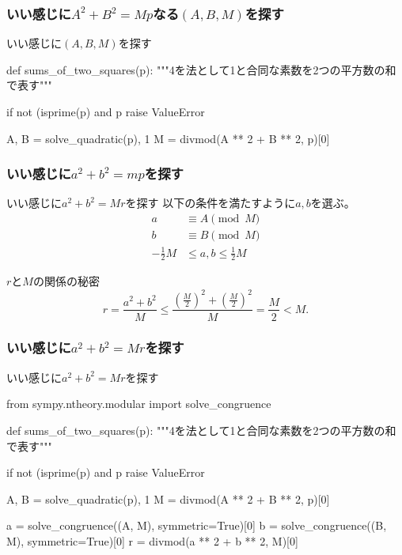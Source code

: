 \documentclass[dvipdfmx,11pt,notheorems]{beamer}
\theoremstyle{definition}
\begin{document}
\begin{frame}[fragile]\frametitle{いい感じに$A^{2}+B^{2} = Mp$なる$(A, B, M)$を探す}

\begin{block}{いい感じに$(A, B, M)$を探す}
\begin{pyverbatim}
def sums_of_two_squares(p):
    """4を法として1と合同な素数を2つの平方数の和で表す"""

    if not (isprime(p) and p %
        raise ValueError
            
    A, B = solve_quadratic(p), 1
    M = divmod(A ** 2 + B ** 2, p)[0]
\end{pyverbatim}
\end{block}

\end{frame}

\begin{frame}[fragile]\frametitle{いい感じに$a^{2}+b^{2}=mp$を探す}

\begin{block}{いい感じに$a^{2}+b^{2}=Mr$を探す}
以下の条件を満たすように$a, b$を選ぶ。
\begin{align*} 
a &\equiv A \pmod{M} \\ 
b &\equiv B \pmod{M} \\ 
-\frac{1}{2}M &\leq a, b \leq \frac{1}{2}M
\end{align*}
\end{block}

\begin{exampleblock}{$r$と$M$の関係の秘密}
\begin{equation*}
r = \frac{a^{2} + b^{2}}{M} \leq \frac{\left (\frac{M}{2} \right)^{2} + \left (\frac{M}{2} \right)^{2}}{M} = \frac{M}{2} < M.
\end{equation*}
\end{exampleblock}

\end{frame}

\begin{frame}[fragile]\frametitle{いい感じに$a^{2}+b^{2}=Mr$を探す}

\begin{block}{いい感じに$a^{2}+b^{2}=Mr$を探す}
\begin{pyverbatim}
from sympy.ntheory.modular import solve_congruence


def sums_of_two_squares(p):
    """4を法として1と合同な素数を2つの平方数の和で表す"""

    if not (isprime(p) and p %
        raise ValueError
                    
    A, B = solve_quadratic(p), 1
    M = divmod(A ** 2 + B ** 2, p)[0]

    a = solve_congruence((A, M), symmetric=True)[0]
    b = solve_congruence((B, M), symmetric=True)[0]
    r = divmod(a ** 2 + b ** 2, M)[0]
\end{pyverbatim}
\end{block}

\end{frame}
\end{document}
